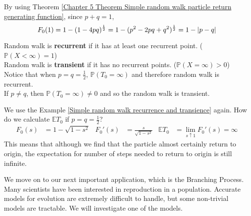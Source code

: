 \documentclass{huhtakm-template-book}
\newcommand{\prob}{\mathbb{P}}
\newcommand{\expect}{\mathbb{E}}
\begin{document}
\begin{proofing}
	By using Theorem \ref{Chapter 5 Theorem Simple random walk particle return generating function}, since $p+q=1$,
	\begin{equation*}
		F_{0}(1)=1-(1-4pq)^{\frac{1}{2}}=1-(p^{2}-2pq+q^{2})^{\frac{1}{2}}=1-\left|{p-q}\right|
	\end{equation*}
\end{proofing}
\begin{rem}
	Random walk is \textbf{recurrent} if it has at least one recurrent point. ($\prob(X<\infty)=1$)\\
	Random walk is \textbf{transient} if it has no recurrent points. ($\prob(X=\infty)>0$)\\
	Notice that when $p=q=\frac{1}{2}$, $\prob(T_{0}=\infty)$ and therefore random walk is recurrent.\\
	If $p\neq q$, then $\prob(T_{0}=\infty)\neq 0$ and so the random walk is transient.
\end{rem}
\begin{eg}
	We use the Example \ref{Simple random walk recurrence and transience} again. How do we calculate $\expect T_{0}$ if $p=q=\frac{1}{2}$?
	\begin{align*}
		F_{0}(s)&=1-\sqrt{1-s^{2}} & F_{0}'(s)&=\frac{s}{\sqrt{1-s^{2}}} & \expect T_{0}&=\lim_{s\uparrow 1}F_{0}'(s)=\infty
	\end{align*}
	This means that although we find that the particle almost certainly return to origin, the expectation for number of steps needed to return to origin is still infinite.
\end{eg}
We move on to our next important application, which is the Branching Process.\\
Many scientists have been interested in reproduction in a population. Accurate models for evolution are extremely difficult to handle, but some non-trivial models are tractable. We will investigate one of the models.
\end{document}
